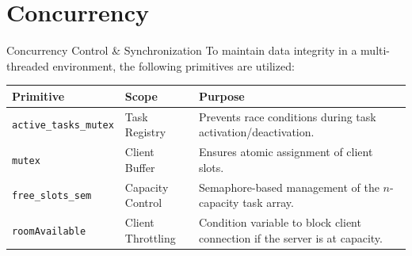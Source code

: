 \section{Concurrency}
\begin{frame}{Concurrency Control \& Synchronization}
    To maintain data integrity in a multi-threaded environment, the following primitives are utilized:
    
    \begin{table}
        \centering
        \begin{tabular}{lll}
            \toprule
            \textbf{Primitive} & \textbf{Scope} & \textbf{Purpose} \\
            \midrule
            \texttt{active\_tasks\_mutex} & Task Registry & Prevents race conditions during task activation/deactivation. \\
            \texttt{mutex} & Client Buffer & Ensures atomic assignment of client slots. \\
            \texttt{free\_slots\_sem} & Capacity Control & Semaphore-based management of the $n$-capacity task array. \\
            \texttt{roomAvailable} & Client Throttling & Condition variable to block client connection if the server is at capacity. \\
            \bottomrule
        \end{tabular}
    \end{table}
\end{frame}

